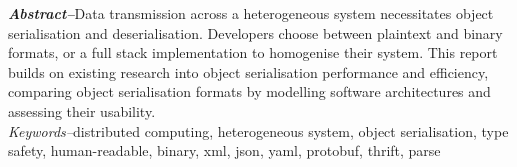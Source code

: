 \documentclass[../report.tex]{subfiles}
\begin{document}
{\textbf{\textit{Abstract--}}Data transmission across a heterogeneous system necessitates object serialisation and deserialisation. Developers choose between plaintext and binary formats, or a full stack implementation to homogenise their system. This report builds on existing research into object serialisation performance and efficiency, comparing object serialisation formats by modelling software architectures and assessing their usability.} \\

\textit{Keywords--}distributed computing, heterogeneous system, object serialisation, type safety, human-readable, binary, xml, json, yaml, protobuf, thrift, parse
\end{document}

